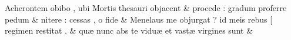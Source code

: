 \documentclass[12pt,onecolumn,twoside,a4paper]{memoir}
\begin{document}
\begin{pairs}
\begin{Leftside}
                     
                              Acherontem
                              obibo
                              ,
                              ubi
                              Mortis
                              thesauri
                              objacent \&
                         \stanza {}procede
                              :
                              gradum
                              proferre
                              pedum & 
                     nitere
                              :
                              cessas
                              ,
                              o
                              fide \&
                         \stanza {}
                     Menelaus
                              me
                              objurgat
                              ?
                              id
                              meis
                              rebus
                              [
                              regimen
                              restitat
                              . \&
                         \stanza {}
                     quæ
                              nunc
                              abs
                              te
                              viduæ
                              et
                              vastæ
                              virgines
                              sunt \&
                     
                  \endnumbering
		\end{Leftside}
                  \begin{Rightside}
			\beginnumbering
			\numberstanzafalse
                     

\end{Rightside}
\end{pairs}
\end{document}
